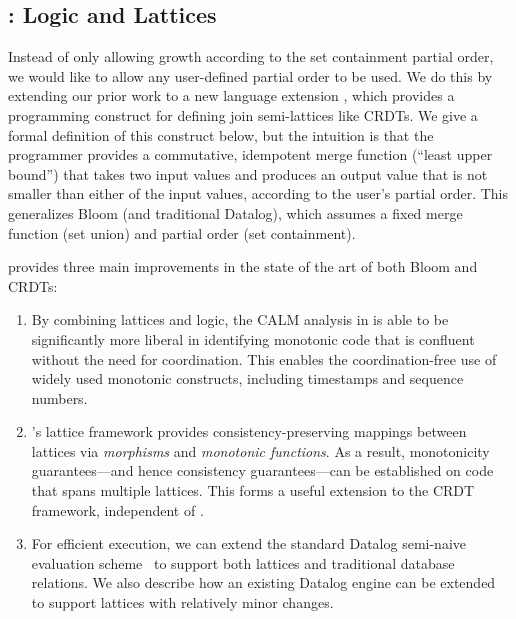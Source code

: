 
\subsection{\lang: Logic and Lattices}
Instead of only allowing growth according to the set containment
partial order, we would like to allow any user-defined partial order to be used.  
We do this by extending our prior work to a new language extension \lang, which provides a programming construct for defining join semi-lattices like CRDTs.
We give a
formal definition of this construct below, but the intuition is that the programmer provides a commutative, idempotent merge function (``least upper bound'')
that takes two input values and produces an output value that is not smaller
than either of the input values, according to the user's partial order. This
generalizes Bloom (and traditional Datalog), which assumes a fixed merge
function (set union) and partial order (set containment).

\lang provides three main improvements in the state of the art of both Bloom and CRDTs:  
\begin{enumerate}
\item By combining lattices and logic, the CALM analysis in \lang is able to be
  significantly more liberal in identifying monotonic code that is confluent
  without the need for coordination.  This enables the coordination-free use of
  widely used monotonic constructs, including timestamps and sequence numbers.
\item {\lang}'s lattice framework provides consistency-preserving mappings between lattices via \emph{morphisms} and \emph{monotonic functions}.  As a result, monotonicity guarantees---and hence consistency guarantees---can be established on code that spans multiple lattices.  This forms a useful extension to the CRDT framework, independent of \lang.
\item For efficient execution, we can extend the standard Datalog semi-naive
evaluation scheme~\cite{Balbin1987} to support both lattices and traditional
database relations. We also describe how an existing Datalog engine can be
extended to support lattices with relatively minor changes.
\end{enumerate}

